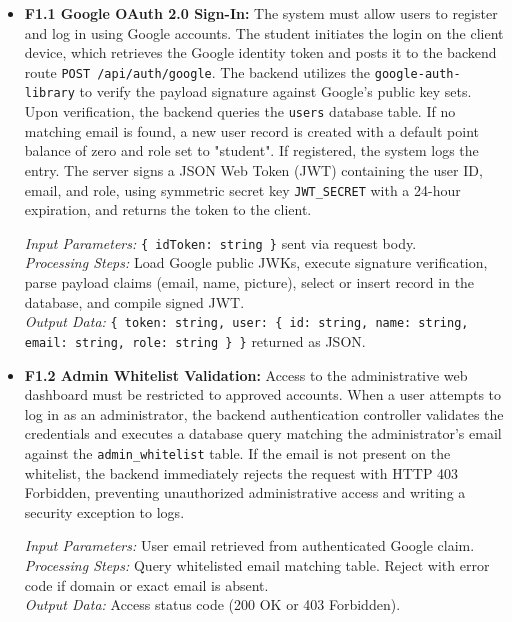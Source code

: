 \documentclass[12,Times new Roman,a4paper]{report}
\begin{document}
\begin{itemize}
    \item \textbf{F1.1 Google OAuth 2.0 Sign-In:} The system must allow users to register and log in using Google accounts. The student initiates the login on the client device, which retrieves the Google identity token and posts it to the backend route \texttt{POST /api/auth/google}. The backend utilizes the \texttt{google-auth-library} to verify the payload signature against Google's public key sets. Upon verification, the backend queries the \texttt{users} database table. If no matching email is found, a new user record is created with a default point balance of zero and role set to "student". If registered, the system logs the entry. The server signs a JSON Web Token (JWT) containing the user ID, email, and role, using symmetric secret key \texttt{JWT\_SECRET} with a 24-hour expiration, and returns the token to the client.
    
    \textit{Input Parameters:} \texttt{\{ idToken: string \}} sent via request body. \\
    \textit{Processing Steps:} Load Google public JWKs, execute signature verification, parse payload claims (email, name, picture), select or insert record in the database, and compile signed JWT. \\
    \textit{Output Data:} \texttt{\{ token: string, user: \{ id: string, name: string, email: string, role: string \} \}} returned as JSON.
    
    \item \textbf{F1.2 Admin Whitelist Validation:} Access to the administrative web dashboard must be restricted to approved accounts. When a user attempts to log in as an administrator, the backend authentication controller validates the credentials and executes a database query matching the administrator's email against the \texttt{admin\_whitelist} table. If the email is not present on the whitelist, the backend immediately rejects the request with HTTP 403 Forbidden, preventing unauthorized administrative access and writing a security exception to logs.
    
    \textit{Input Parameters:} User email retrieved from authenticated Google claim. \\
    \textit{Processing Steps:} Query whitelisted email matching table. Reject with error code if domain or exact email is absent. \\
    \textit{Output Data:} Access status code (200 OK or 403 Forbidden).
    

\end{itemize}
\end{document}
